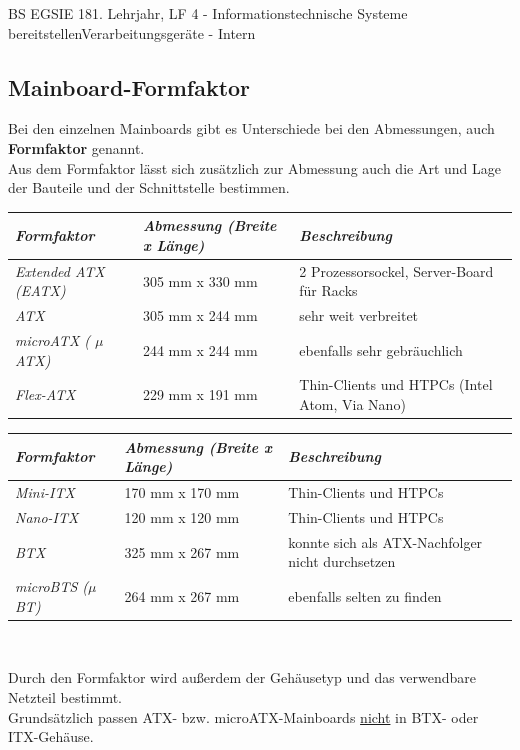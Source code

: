 \documentclass[oneside,openany,headings=optiontotoc,11pt,numbers=noenddot]{article}
\begin{document}
\begin{worksheet}{BS EGSIE 18}{1. Lehrjahr, LF 4 - Informationstechnische Systeme bereitstellen}{Verarbeitungsgeräte - Intern}
		\subsection*{Mainboard-Formfaktor}
		Bei den einzelnen Mainboards gibt es Unterschiede bei den Abmessungen, auch \textbf{Formfaktor} genannt.\\
		Aus dem Formfaktor lässt sich zusätzlich zur Abmessung auch die Art und Lage der Bauteile und der Schnittstelle bestimmen.\\
		\par\noindent
		\begin{tabularx}{\textwidth}{|X|X|X|}
			\hline
			\rowcolor{gray!15} \textit{Formfaktor} & \textit{Abmessung (Breite x Länge)} & \textit{Beschreibung}\\
			\hline
			\hline
			\textit{Extended ATX (EATX)} & 305 mm x 330 mm & 2 Prozessorsockel, Server-Board für Racks\\
			\hline
			\textit{ATX} & 305 mm x 244 mm & sehr weit verbreitet\\
			\hline
			\textit{microATX ( $\mu$ATX)} & 244 mm x 244 mm &  ebenfalls sehr gebräuchlich\\
			\hline
			\textit{Flex-ATX} & 229 mm x 191 mm & Thin-Clients und HTPCs (Intel Atom, Via Nano)\\
			\hline
		\end{tabularx}
		\begin{tabularx}{\textwidth}{|X|X|X|}
			\hline
			\rowcolor{gray!15} \textit{Formfaktor} & \textit{Abmessung (Breite x Länge)} & \textit{Beschreibung}\\
			\hline
			\hline
			\textit{Mini-ITX} & 170 mm x 170 mm & Thin-Clients und HTPCs\\
			\hline
			\textit{Nano-ITX} & 120 mm x 120 mm & Thin-Clients und HTPCs\\
			\hline
			\textit{BTX} & 325 mm x 267 mm & konnte sich als ATX-Nachfolger nicht durchsetzen\\
			\hline
			\textit{microBTS ($\mu$BT)} & 264 mm x 267 mm & ebenfalls selten zu finden\\
			\hline
		\end{tabularx}\\
		\par\noindent
		Durch den Formfaktor wird außerdem der Gehäusetyp und das verwendbare Netzteil bestimmt.\\
		Grundsätzlich passen ATX- bzw. microATX-Mainboards \underline{nicht} in BTX- oder ITX-Gehäuse.
	\end{worksheet}
\end{document}
